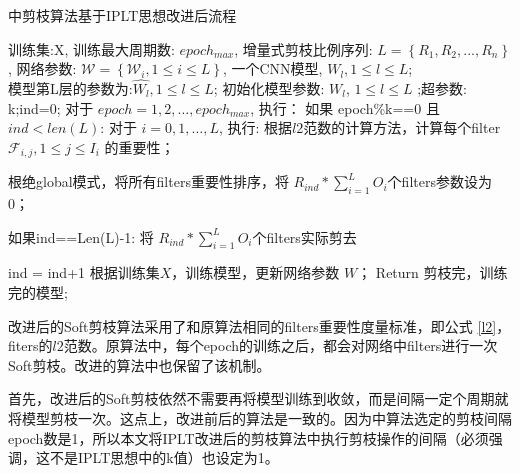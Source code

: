 \documentclass[ pdftex, oneside, master]{NJUthesis}
\begin{document}
\begin{algorithm}[htb]
  \caption{\cite{27}中剪枝算法基于IPLT思想改进后流程}
  \label{27iplt}
  \begin{algorithmic}[1]
    \REQUIRE
      训练集:X, 训练最大周期数: $epoch_{max}$,
      增量式剪枝比例序列: $L = \left\{R_1, R_2, ..., R_n\right\}$ ,
      网络参数: $\mathcal{W} = \left\{\mathcal{W}_i , 1\leq i \leq L \right\}$,
      一个CNN模型, ${W_l,1\leq l\leq L}$;\\
    \ENSURE 模型第L层的参数为:${\hat{W_l}, 1\leq l\leq L}$;
    \STATE 初始化模型参数: ${W_l}$, ${1\leq l\leq L}$ ;超参数: k;ind=0;
    \STATE 对于 ${epoch=1, 2, \ldots, epoch_{max}}$, 执行：
    \STATE \qquad 如果 epoch\%k==0 且 $ind<len(L)$:
    \STATE \qquad \qquad 对于 $i=0, 1, \ldots, L$, 执行:
    \STATE \qquad \qquad \qquad 根据$l2$范数的计算方法，计算每个filter $\mathcal{F}_{i,j}, 1\leq j \leq I_i$ 的重要性；

    \STATE \qquad \qquad  根绝global模式，将所有filters重要性排序，将 $R_{ind}\ast\sum_{i=1}^LO_i$个filters参数设为0；

    \STATE \qquad \qquad 如果ind==Len(L)-1:
    \STATE \qquad \qquad \qquad 将 $R_{ind}\ast\sum_{i=1}^LO_i$个filters实际剪去

    \STATE \qquad \qquad ind = ind+1
    \STATE \qquad 根据训练集$X$，训练模型，更新网络参数 $W$；
    \STATE Return 剪枝完，训练完的模型;
  \end{algorithmic}
\end{algorithm}

改进后的Soft剪枝算法采用了和原算法\cite{27}相同的filters重要性度量标准，即公式 \ref{l2}，fiters的$l2$范数。原算法中，每个epoch的训练之后，都会对网络中filters进行一次Soft剪枝。改进的算法中也保留了该机制。

首先，改进后的Soft剪枝依然不需要再将模型训练到收敛，而是间隔一定个周期就将模型剪枝一次。这点上，改进前后的算法是一致的。因为\cite{27}中算法选定的剪枝间隔epoch数是1，所以本文将IPLT改进后的剪枝算法中执行剪枝操作的间隔（必须强调，这不是IPLT思想中的k值）也设定为1。
\end{document}
